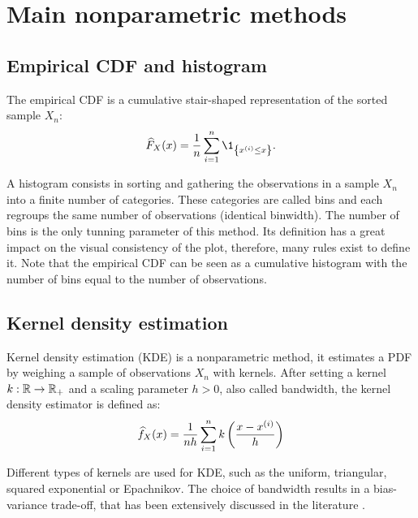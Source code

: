 \section{Main nonparametric methods}


\subsection*{Empirical CDF and histogram}
The empirical CDF is a cumulative stair-shaped representation of the sorted sample $X_n$:
\begin{equation}
    \what{F}_X(x) = \frac1n \sum_{i=1}^{n} \1_{\left\{x^{(i)} \leq x\right\}}.
\end{equation}

A histogram consists in sorting and gathering the observations in a sample $X_n$ into a finite number of categories. 
These categories are called bins and each regroups the same number of observations (identical binwidth). 
The number of bins is the only tunning parameter of this method. 
Its definition has a great impact on the visual consistency of the plot, therefore, many rules exist to define it.
Note that the empirical CDF can be seen as a cumulative histogram with the number of bins equal to the number of observations.


\subsection*{Kernel density estimation}
Kernel density estimation (KDE) is a nonparametric method, it estimates a PDF by weighing a sample of observations $X_n$ with kernels.  
After setting a kernel $k: \mathbb{R} \rightarrow \mathbb{R}_+$ and a scaling parameter $h>0$, also called bandwidth, the kernel density estimator is defined as:
\begin{equation}
    \widehat{f}_X(x) = \frac{1}{n h}\sum_{i=1}^{n} k\left(\frac{x - x^{(i)}}{h}\right)
\end{equation}

Different types of kernels are used for KDE, such as the uniform, triangular, squared exponential or Epachnikov. 
The choice of bandwidth results in a bias-variance trade-off, that has been extensively discussed in the literature \citep{wand_jones_1994_kde}.

